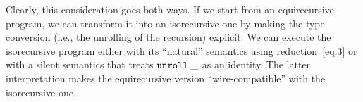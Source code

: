 Clearly, this consideration goes both ways. If we start from an
equirecursive program, we can transform it into an isorecursive one by
making the type conversion (i.e., the unrolling of the recursion)
explicit. We can execute the isorecursive 
program either with its ``natural'' semantics using
reduction~\eqref{eq:3} or with a silent 
semantics that treats $\mathtt{unroll}\; \_$ as an identity.
The latter interpretation makes the equirecursive version
``wire-compatible'' with the isorecursive one.
  

